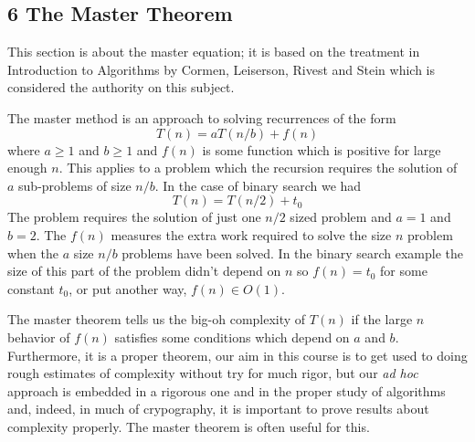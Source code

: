 \documentclass[11pt,a4paper]{scrartcl}
\begin{document}
\subsection*{6 The Master Theorem}

This section is about the master equation; it is based on the
treatment in Introduction to Algorithms by Cormen, Leiserson, Rivest
and Stein which is considered the authority on this subject.

The master method is an approach to solving recurrences of the form
\begin{equation}
T(n)=aT(n/b)+f(n)
\end{equation}
where $a\ge 1$ and $b\ge 1$ and $f(n)$ is some function which is
positive for large enough $n$. This applies to a problem which the
recursion requires the solution of $a$ sub-problems of size $n/b$. In
the case of binary search we had
\begin{equation}
T(n)=T(n/2)+t_0
\end{equation}
The problem requires the solution of just one $n/2$ sized problem and
$a=1$ and $b=2$. The $f(n)$ measures the extra work required to solve
the size $n$ problem when the $a$ size $n/b$ problems have been
solved. In the binary search example the size of this part of the
problem didn't depend on $n$ so $f(n)=t_0$ for some constant $t_0$, or put
another way, $f(n)\in O(1)$.

The master theorem tells us the big-oh complexity of $T(n)$ if the
large $n$ behavior of $f(n)$ satisfies some conditions which depend on
$a$ and $b$. Furthermore, it is a proper theorem, our aim in this
course is to get used to doing rough estimates of complexity without
try for much rigor, but our \textsl{ad hoc} approach is embedded in a
rigorous one and in the proper study of algorithms and, indeed, in
much of crypography, it is important to prove results about complexity
properly. The master theorem is often useful for this.
\end{document}
